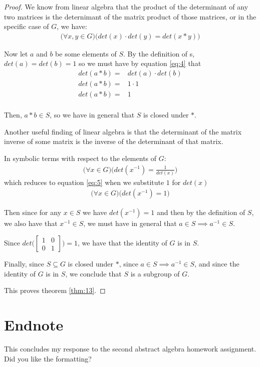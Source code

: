 \documentclass[12pt]{article}
\begin{document}
\begin{proof}
	We know
	from linear algebra
	that the product of the determinant of any two matrices
	is the deternimant of the matrix product of those matrices,
	or in the specific case of $G$, we have:
	\begin{align} \label{eq:4}
	\Big(\forall x,y \in G\Big)\Big(det(x) \cdot det(y) = det(x * y)\Big)
	\end{align}

	Now let $a$ and $b$ be some elements of $S$.
	By the definition of s,
	$det(a) = det(b) = 1$
	so we must have by equation \ref{eq:4} that
	\begin{align}
		det(a * b) = & det(a) \cdot det(b) \\
		det(a * b) = & 1 \cdot 1 \\
		det(a * b) = & 1 \\
	\end{align}

	Then, $a * b \in S$,
	so we have in general that $S$ is closed under $*$.


	Another useful finding
	of linear algebra is
	that the determinant of the matrix inverse of some matrix
	is the inverse of the determinant of that matrix.

	In symbolic terms with respect to the elements of $G$:
	\begin{align}
		\Big(\forall x\in G\Big)\Big(det(x^{-1}) = \frac{1}{det(x)}\Big)
	\end{align}
	which reduces to equation \ref{eq:5}
	when we substitute $1$ for $det(x)$
	\begin{align} \label{eq:5}
		\Big(\forall x\in G\Big)\Big(det(x^{-1}) = 1\Big)
	\end{align}

	Then since for any $x \in S$ we have $det(x^{-1}) = 1$
	and then by the definition of $S$,
	we also have that $x^{-1} \in S$,
	we must have in general
	that $a \in S \implies a^{-1} \in S$.

	Since $det\Bigg(\begin{bmatrix} 1 & 0 \\ 0 & 1 \end{bmatrix}\Bigg) = 1$,
	we have that the identity of $G$ is in $S$.

	Finally,
	since $S \subseteq G$ is closed under $*$,
	since $a \in S \implies a^{-1} \in S$,
	and since the identity of $G$ is in $S$,
	we conclude that $S$ is a subgroup of $G$.

	This proves theorem \ref{thm:13}.
\end{proof}

\section{Endnote}

This concludes my response to the second abstract algebra homework assignment.
Did you like the formatting?

\pagebreak
\end{document}
